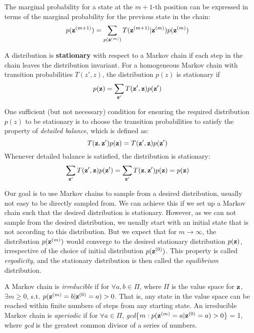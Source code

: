 The marginal probability for a state at the $m+1$-th position can be expressed in terms of the marginal probability for the previous state in the chain:
$$p({\bf z}^{(m+1)})=\sum_{p({\bf z}^{(m)})} T({\bf z}^{(m+1)}|{\bf z}^{(m)})p({\bf z}^{(m)})$$

A distribution is {\bf stationary} with respect to a Markov chain if each step in the chain leaves the distribution invariant. For a homogeneous Markov chain 
with transition probabilities $T(z',z)$, the distribution $p(z)$ is stationary if
$$p({\bf z}) = \sum_{{\bf z'}}T({\bf z'}, {\bf z})p({\bf z'})$$

One sufficient (but not necessary) condition for ensuring the required distribution $p(z)$ to be stationary is to choose the transition probabilities to satisfy the property
of {\it detailed balance}, which is defined as:
$$T({\bf z}, {\bf z'})p({\bf z}) = T({\bf z'}, {\bf z})p({\bf z'})$$
Whenever detailed balance is satisfied, the distribution is stationary:
$$\sum_{{\bf z'}}T({\bf z'}, {\bf z})p({\bf z'}) = \sum_{{\bf z'}}T({\bf z}, {\bf z'})p({\bf z}) = p({\bf z})$$

Our goal is to use Markov chains to sample from a desired distribution, usually not easy to be directly sampled from. We can achieve this if we set up a Markov chain such that the desired distribution is stationary. However, as we can not 
sample from the desired distribution, we usually start with an initial state that is not according to this distribution.
But we expect that for $m \rightarrow \infty$, the distribution $p({\bf z}^{(m)})$ would converge to the desired stationary distribution $p({\bf z})$, irrespective of the choice of initial distribution $p({\bf z}^{(0)})$. This property is called {\it ergodicity}, and the stationary distribution is then called the {\it equilibrium} distribution.


A Markov chain is {\it irreducible} if for $\forall a, b\in \Pi$, where $\Pi$ is the value space for ${\bf z}$, $\exists m\geq 0$, s.t. $p({\bf z}^{(m)}=b|{\bf z}^{(0)}=a)>0$. That is, any state in the value space can be reached within
finite numbers of steps from any starting state. An irreducible Markov chain is {\it aperiodic} if for $\forall a \in \Pi$, {\it gcd}\{$m:p({\bf z}^{(m)}=a|{\bf z}^{(0)}=a)>0$\} = 1, where {\it gcd} is the greatest common divisor of a series of numbers.


